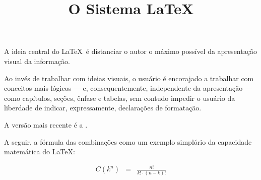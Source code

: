 \documentclass[12pt,a4paper]{article}
\title{O Sistema \LaTeX}
\begin{document}
	\maketitle
	A ideia central do \LaTeX\ é distanciar o autor
	o máximo possível da apresentação visual da informação.
	
	Ao invés de trabalhar com ideias visuais, o usuário é
	encorajado a trabalhar com conceitos mais lógicos --- e,
	consequentemente, independente da apresentação --- como capítulos,
	seções, ênfase e tabelas, sem contudo impedir o usuário da
	liberdade de indicar, expressamente, declarações de formatação.
	
	A versão mais recente é a \LaTeXe.
	
	A seguir, a fórmula das combinações como um exemplo simplório
	da capacidade matemática do \LaTeX:
	
	\begin{eqnarray}
	C \left (k^n\right) &=& \frac{n!}{k!\cdot(n-k)!}
	\end{eqnarray}
	  
	
\end{document}
